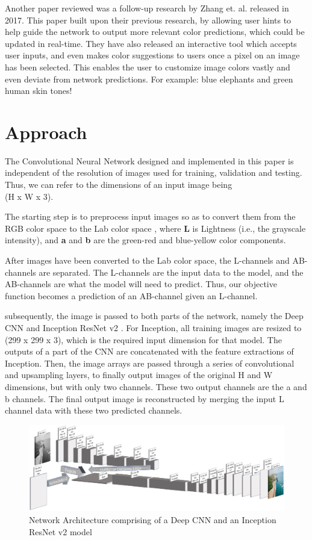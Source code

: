 \documentclass[10pt,twocolumn,letterpaper]{article}
\begin{document}
	Another paper reviewed was a follow-up research by Zhang et. al. \cite{Zhang2} released in 2017. This paper built upon their previous research, by allowing user hints to help guide the network to output more relevant color predictions, which could be updated in real-time. They have also released an interactive tool which accepts user inputs, and even makes color suggestions to users once a pixel on an image has been selected. This enables the user to customize image colors vastly and even deviate from network predictions. For example: blue elephants and green human skin tones!

	\section{Approach}
	The Convolutional Neural Network designed and implemented in this paper is independent of the resolution of images used for training, validation and testing. Thus, we can refer to the dimensions of an input image being\\
	(H x W x 3).

	The starting step is to preprocess input images so as to convert them from the RGB color space to the Lab color space \cite{LabColorSpace}, where \textbf{L} is Lightness (i.e., the grayscale intensity), and \textbf{a} and \textbf{b} are the green-red and blue-yellow color components.

	After images have been converted to the Lab color space, the L-channels and AB-channels are separated. The L-channels are the input data to the model, and the AB-channels are what the model will need to predict. Thus, our objective function becomes a prediction of an AB-channel given an L-channel.

	subsequently, the image is passed to both parts of the network, namely the Deep CNN and Inception ResNet v2 \cite{Inception}. For Inception, all training images are resized to\\(299 x 299 x 3), which is the required input dimension for that model. The outputs of a part of the CNN are concatenated with the feature extractions of Inception. Then, the image arrays are passed through a series of convolutional and upsampling layers, to finally output images of the original H and W dimensions, but with only two channels. These two output channels are the a and b channels. The final output image is reconstructed by merging the input L channel data with these two predicted channels.

	\begin{figure}
		\includegraphics[width=\textwidth]{Architecture}
		\caption{Network Architecture comprising of a Deep CNN and an Inception ResNet v2 model}
	\end{figure}
\end{document}
